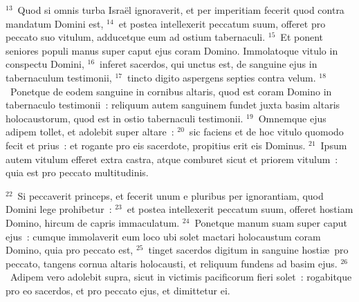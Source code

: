 ${}^{13}$~Quod si omnis turba Isra\"el ignoraverit, et per imperitiam fecerit quod contra mandatum Domini est,
${}^{14}$~et postea intellexerit peccatum suum, offeret pro peccato suo vitulum, adducetque eum ad ostium tabernaculi.
${}^{15}$~Et ponent seniores populi manus super caput ejus coram Domino. Immolatoque vitulo in conspectu Domini,
${}^{16}$~inferet sacerdos, qui unctus est, de sanguine ejus in tabernaculum testimonii,
${}^{17}$~tincto digito aspergens septies contra velum.
${}^{18}$~Ponetque de eodem sanguine in cornibus altaris, quod est coram Domino in tabernaculo testimonii~: reliquum autem sanguinem fundet juxta basim altaris holocaustorum, quod est in ostio tabernaculi testimonii.
${}^{19}$~Omnemque ejus adipem tollet, et adolebit super altare~:
${}^{20}$~sic faciens et de hoc vitulo quomodo fecit et prius~: et rogante pro eis sacerdote, propitius erit eis Dominus.
${}^{21}$~Ipsum autem vitulum efferet extra castra, atque comburet sicut et priorem vitulum~: quia est pro peccato multitudinis.


${}^{22}$~Si peccaverit princeps, et fecerit unum e pluribus per ignorantiam, quod Domini lege prohibetur~:
${}^{23}$~et postea intellexerit peccatum suum, offeret hostiam Domino, hircum de capris immaculatum.
${}^{24}$~Ponetque manum suam super caput ejus~: cumque immolaverit eum loco ubi solet mactari holocaustum coram Domino, quia pro peccato est,
${}^{25}$~tinget sacerdos digitum in sanguine hosti\ae\ pro peccato, tangens cornua altaris holocausti, et reliquum fundens ad basim ejus.
${}^{26}$~Adipem vero adolebit supra, sicut in victimis pacificorum fieri solet~: rogabitque pro eo sacerdos, et pro peccato ejus, et dimittetur ei.


